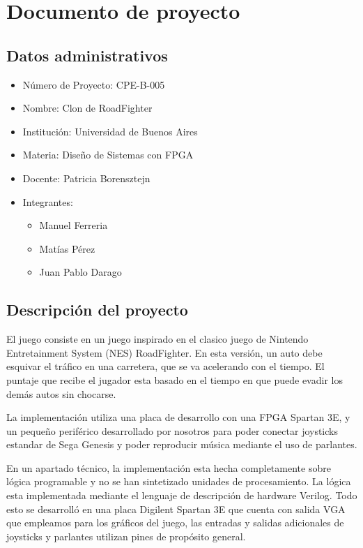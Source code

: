 \documentclass[10pt, a4paper,english,spanish]{article}
\begin{document}
\section{Documento de proyecto}

\subsection{Datos administrativos}

\begin{itemize}
	\item N\'umero de Proyecto: CPE-B-005
	\item Nombre: Clon de RoadFighter
	\item Instituci\'on: Universidad de Buenos Aires
	\item Materia: Dise\~no de Sistemas con FPGA
	\item Docente: Patricia Borensztejn
	\item Integrantes: \begin{itemize}
		\item Manuel Ferreria
		\item Mat\'ias P\'erez
		\item Juan Pablo Darago
	\end{itemize} 
\end{itemize}

\subsection{Descripci\'on del proyecto}

El juego consiste en un juego inspirado en el clasico juego de Nintendo
Entretainment System (NES) RoadFighter. En esta versión, un auto debe
esquivar el tráfico en una carretera, que se va acelerando con el tiempo.
El puntaje que recibe el jugador esta basado en el tiempo en que puede
evadir los demás autos sin chocarse.

La implementación utiliza una placa de desarrollo con una FPGA Spartan 3E, 
y un pequeño periférico desarrollado por nosotros para poder conectar
joysticks estandar de Sega Genesis y poder reproducir música mediante el
uso de parlantes. 

En un apartado técnico, la implementación esta hecha completamente 
sobre lógica programable y no se han sintetizado unidades de procesamiento.
La lógica esta implementada mediante el lenguaje de descripción de hardware
Verilog. Todo esto se desarrolló en una placa Digilent Spartan 3E que 
cuenta con salida VGA que empleamos para los gráficos del juego, las entradas
y salidas adicionales de joysticks y parlantes utilizan pines de propósito
general. 
\end{document}
